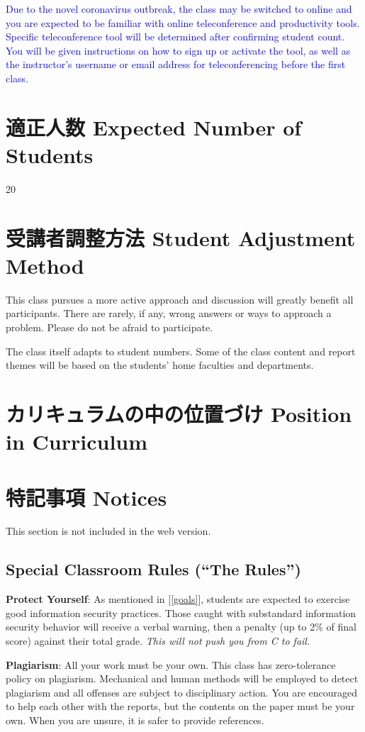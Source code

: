 \documentclass{article}
\begin{document}
\textcolor{blue}{Due to the novel coronavirus outbreak, the class may be switched to online and you are expected to be familiar with online teleconference and productivity tools. Specific teleconference tool will be determined after confirming student count. You will be given instructions on how to sign up or activate the tool, as well as the instructor's username or email address for teleconferencing before the first class.}

\section{適正人数 Expected Number of Students}
20

\section{受講者調整方法 Student Adjustment Method}
This class pursues a more active approach and discussion will greatly benefit all participants. There are rarely, if any, wrong answers or ways to approach a problem. Please do not be afraid to participate.

The class itself adapts to student numbers. Some of the class content and report themes will be based on the students' home faculties and departments.

\section{カリキュラムの中の位置づけ Position in Curriculum}
\section{特記事項 Notices}
This section is not included in the web version.

\subsection{Special Classroom Rules (``The Rules'')}

\textbf{Protect Yourself}: As mentioned in [\ref{goals}], students are expected to exercise good information security practices. Those caught with substandard information security behavior will receive a verbal warning, then a penalty (up to 2\% of final score) against their total grade. \textit{This will not push you from C to fail.}

\smallskip\noindent
\textbf{Plagiarism}: All your work must be your own. This class has zero-tolerance policy on plagiarism. Mechanical and human methods will be employed to detect plagiarism and all offenses are subject to disciplinary action. You are encouraged to help each other with the reports, but the contents on the paper must be your own. When you are unsure, it is safer to provide references.
\end{document}
